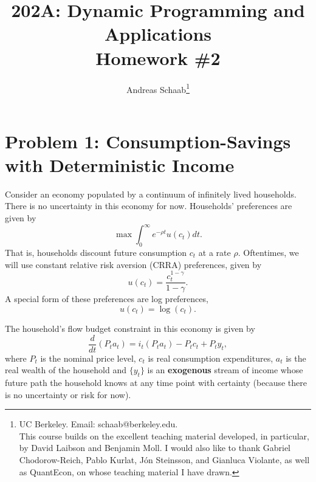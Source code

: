 \documentclass[11pt]{extarticle}
\title{202A: Dynamic Programming and Applications\\[5pt] {\Large \textbf{Homework \#2}}}
\author{Andreas Schaab\footnote{
	UC Berkeley. Email: schaab@berkeley.edu.\\
	This course builds on the excellent teaching material developed, in particular, by David Laibson and Benjamin Moll. I would also like to thank Gabriel Chodorow-Reich, Pablo Kurlat, J\'on Steinsson, and Gianluca Violante, as well as QuantEcon, on whose teaching material I have drawn. 
}}
\date{}
\theoremstyle{plain}
\theoremstyle{definition}
\begin{document}
\maketitle


\section*{Problem 1: Consumption-Savings with Deterministic Income}

Consider an economy populated by a continuum of infinitely lived households. There is no uncertainty in this economy for now. Households' preferences are given by
\begin{equation*}
	\max \int_0^\infty e^{-\rho t} u(c_t) dt.
\end{equation*}
That is, households discount future consumption $c_t$ at a rate $\rho$. Oftentimes, we will use constant relative risk aversion (CRRA) preferences, given by
\begin{equation*}
	u(c_t) = \frac{c_t^{1-\gamma}}{1-\gamma}.
\end{equation*}
A special form of these preferences are log preferences, 
\begin{equation*}
	u(c_t) = \log(c_t). 
\end{equation*}


The household's flow budget constraint in this economy is given by
\begin{equation*}
	\frac{d}{dt}(P_t a_t) = i_t (P_t a_t) - P_t c_t + P_t y_t,
\end{equation*}
where $P_t$ is the nominal price level, $c_t$ is real consumption expenditures, $a_t$ is the real wealth of the household and $\{y_t\}$ is an \textbf{exogenous} stream of income whose future path the household knows at any time point with certainty (because there is no uncertainty or risk for now).
\end{document}
